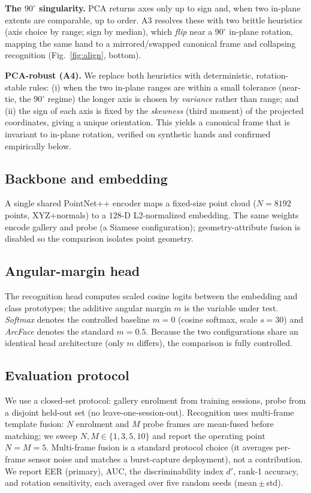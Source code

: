 \documentclass[conference]{IEEEtran}
\begin{document}
\textbf{The $90^{\circ}$ singularity.} PCA returns axes only up to sign and, when
two in-plane extents are comparable, up to order. A3 resolves these with two
brittle heuristics (axis choice by range; sign by median), which \emph{flip} near
a $90^{\circ}$ in-plane rotation, mapping the same hand to a mirrored/swapped
canonical frame and collapsing recognition (Fig.~\ref{fig:align}, bottom).

\textbf{PCA-robust (A4).} We replace both heuristics with deterministic,
rotation-stable rules: (i) when the two in-plane ranges are within a small
tolerance (near-tie, the $90^{\circ}$ regime) the longer axis is chosen by
\emph{variance} rather than range; and (ii) the sign of each axis is fixed by the
\emph{skewness} (third moment) of the projected coordinates, giving a unique
orientation. This yields a canonical frame that is invariant to in-plane rotation,
verified on synthetic hands and confirmed empirically below.

\subsection{Backbone and embedding}
A single shared PointNet++ encoder maps a fixed-size point cloud
($N{=}8192$ points, XYZ+normals) to a $128$-D L2-normalized embedding. The same
weights encode gallery and probe (a Siamese configuration); geometry-attribute
fusion is disabled so the comparison isolates point geometry.

\subsection{Angular-margin head}
The recognition head computes scaled cosine logits between the embedding and
class prototypes; the additive angular margin $m$ is the variable under test.
\emph{Softmax} denotes the controlled baseline $m{=}0$ (cosine softmax,
scale $s{=}30$) and \emph{ArcFace} denotes the standard $m{=}0.5$. Because the two
configurations share an identical head architecture (only $m$ differs), the
comparison is fully controlled.

\subsection{Evaluation protocol}
We use a closed-set protocol: gallery enrolment from training sessions, probe from
a disjoint held-out set (no leave-one-session-out). Recognition uses multi-frame
template fusion: $N$ enrolment and $M$ probe frames are mean-fused before matching;
we sweep $N,M\in\{1,3,5,10\}$ and report the operating point $N{=}M{=}5$.
Multi-frame fusion is a standard protocol choice (it averages per-frame sensor
noise and matches a burst-capture deployment), not a contribution. We report EER
(primary), AUC, the discriminability index $d'$, rank-1 accuracy, and rotation
sensitivity, each averaged over five random seeds (mean\,$\pm$\,std).
\end{document}
